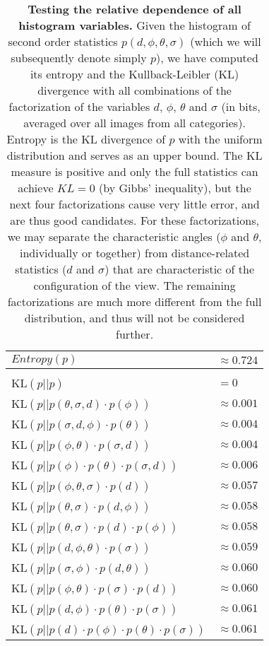 \documentclass[a4paper]{article}
\begin{document}
\begin{table}[h!] 
\caption{{\bf Testing the relative dependence of all histogram variables.}
Given the histogram of second order statistics $p(d, \phi, \theta, \sigma)$ 
(which we will subsequently denote simply $p$), 
we have computed its entropy and the Kullback-Leibler (KL) divergence with all
combinations of the factorization of the variables $d$, $\phi$, $\theta$ and
$\sigma$ (in bits, averaged over all images from all categories). 
Entropy is the KL divergence of $p$ with the uniform distribution and serves as an upper bound.
The KL measure is positive and only the full statistics can achieve
$KL=0$ (by Gibbs' inequality), but the next four factorizations cause
very little error, and are thus good candidates. For these factorizations,
we may separate the characteristic angles ($\phi$ and $\theta$, individually or together) from
distance-related statistics ($d$ and $\sigma$) that are characteristic of the
configuration of the view. 
The remaining factorizations are much more different from the full distribution, 
and thus will not be considered further.\label{tab:KL}} 
\begin{center}
\begin{tabular}{@{\vrule height 1.5pt depth 4pt width 0pt}ll}
$Entropy(p)$ & $\approx 0.724$\\
 \hline \\[-1ex]
KL$(p || p)$ & $ = 0 $\\[1ex] 
KL$(p || p(\theta, \sigma, d)\cdot p(\phi))$               & $\approx  0.001$\\
KL$(p || p(\sigma, d, \phi)\cdot p(\theta))$               & $\approx  0.004$\\
KL$(p || p(\phi, \theta)\cdot p(\sigma, d))$               & $\approx  0.004$\\
KL$(p || p(\phi)\cdot p(\theta)\cdot p(\sigma, d))$        & $\approx  0.006$\\[1ex]
KL$(p || p(\phi, \theta, \sigma)\cdot p(d))$               & $\approx  0.057$\\
KL$(p || p(\theta, \sigma)\cdot p(d, \phi))$               & $\approx  0.058$\\
KL$(p || p(\theta, \sigma)\cdot p(d)\cdot p(\phi))$        & $\approx  0.058$\\
KL$(p || p(d, \phi, \theta)\cdot p(\sigma))$               & $\approx  0.059$\\
KL$(p || p(\sigma, \phi)\cdot p(d, \theta))$               & $\approx  0.060$\\
KL$(p || p(\phi, \theta)\cdot p(\sigma)\cdot p(d))$        & $\approx  0.060$\\
KL$(p || p(d, \phi)\cdot p(\theta)\cdot p(\sigma))$        & $\approx  0.061$\\
KL$(p || p(d)\cdot p(\phi)\cdot p(\theta)\cdot p(\sigma))$ & $\approx  0.061$
\end{tabular}
\end{center}
\end{table}
\end{document}
